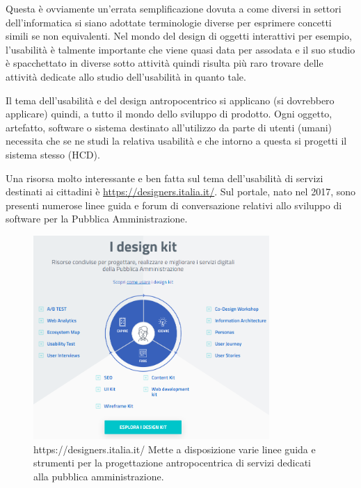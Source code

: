 Questa è ovviamente un'errata semplificazione dovuta a come diversi in settori dell'informatica si siano adottate terminologie diverse per esprimere concetti simili se non equivalenti. Nel mondo del design di oggetti interattivi per esempio, l'usabilità è talmente importante che viene quasi data per assodata e il suo studio è spacchettato in diverse sotto attività quindi risulta più raro trovare delle attività dedicate allo studio dell'usabilità in quanto tale.

Il tema dell'usabilità e del design antropocentrico si applicano (si dovrebbero applicare) quindi, a tutto il mondo dello sviluppo di prodotto. Ogni oggetto, artefatto, software o sistema destinato all'utilizzo da parte di utenti (umani) necessita che se ne studi la relativa usabilità e che intorno a questa si progetti il sistema stesso (HCD).

Una risorsa molto interessante e ben fatta sul tema dell'usabilità di servizi destinati ai cittadini è \url{https://designers.italia.it/}. Sul portale, nato nel 2017, sono presenti numerose linee guida e forum di conversazione relativi allo sviluppo di software per la Pubblica Amministrazione. 

\begin{figure}[!h]
	\centering
	\includegraphics[width=0.8\textwidth]{../immagini/designeritalia}
	\caption{https://designers.italia.it/ Mette a disposizione varie linee guida e strumenti per la progettazione antropocentrica di servizi dedicati alla pubblica amministrazione.}
	\label{designersitalia}
\end{figure}
